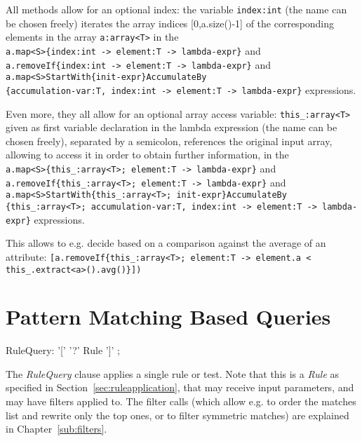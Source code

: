All methods allow for an optional index: the variable \texttt{index:int} (the name can be chosen freely) iterates the array indices [0,a.size()-1] of the corresponding elements in the array \texttt{a:array<T>} in the\\
\verb#a.map<S>{index:int -> element:T -> lambda-expr}# and\\
\verb#a.removeIf{index:int -> element:T -> lambda-expr}# and\\
\verb#a.map<S>StartWith{init-expr}AccumulateBy#\\
\verb#{accumulation-var:T, index:int -> element:T -> lambda-expr}#
expressions.

Even more, they all allow for an optional array access variable: \verb#this_:array<T># given as first variable declaration in the lambda expression (the name can be chosen freely), separated by a semicolon, references the original input array, allowing to access it in order to obtain further information, in the\\
\verb#a.map<S>{this_:array<T>; element:T -> lambda-expr}# and\\
\verb#a.removeIf{this_:array<T>; element:T -> lambda-expr}# and\\
\verb#a.map<S>StartWith{this_:array<T>; init-expr}AccumulateBy#\\
\verb#{this_:array<T>; accumulation-var:T, index:int -> element:T -> lambda-expr}# expressions.

This allows to e.g. decide based on a comparison against the average of an attribute: \verb#[a.removeIf{this_:array<T>; element:T -> element.a < this_.extract<a>().avg()}])#

\section{Pattern Matching Based Queries}\label{sec:patternbasedgraphquery}

\begin{rail}
  RuleQuery: '[' '?' Rule ']' ;
\end{rail}

The \emph{RuleQuery} clause applies a single rule or test.
Note that this is a \emph{Rule} as specified in Section~\ref{sec:ruleapplication}, that may receive input parameters, and may have filters applied to.
The filter calls (which allow e.g. to order the matches list and rewrite only the top ones, or to filter symmetric matches) are explained in Chapter~\ref{sub:filters}.

